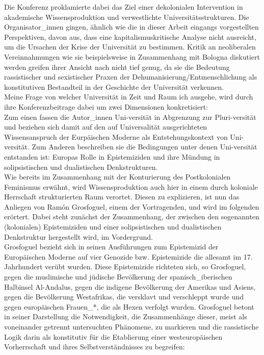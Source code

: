 Die Konferenz proklamierte dabei das Ziel einer dekolonialen
Intervention in akademische Wissensproduktion und verwestlichte
Universitätsstrukturen. Die Organisator\_innen gingen, ähnlich wie die in dieser
Arbeit eingangs vorgestellten Perspektiven, davon aus, dass eine
kapitalismuskritische Analyse nicht ausreicht, um die Ursachen der Krise der
Universität zu bestimmen. Kritik an neoliberalen Vereinnahmungen wie sie
beispielsweise in Zusammenhang mit Bologna diskutiert werden \footnotemark
{} greifen ihrer
Ansicht nach nicht tief genug, da sie die Bedeutung rassistischer und
sexistischer Praxen der Dehumanisierung/Entmenschlichung als konstitutiven
Bestandteil in der Geschichte der Universität verkennen. 
\\

Meine Frage von
welcher Universität in Zeit und Raum ich ausgehe, wird durch ihre
Konferenzbeitrage dabei um zwei Dimensionen konkretisiert:\\
 Zum einen fassen die
Autor\_innen Uni-versität in Abgrenzung zur Pluri-versität und beziehen sich
damit auf den auf Universalität ausgerichteten Wissensanspruch der Eurpäischen
Moderne als Entstehungskontext von Uni-versität. Zum Anderen beschreiben sie
die Bedingungen unter denen Uni-versität entstanden ist: Europas Rolle in
Epistemiziden und ihre Mündung in solipsistischen und dualistischen
Denkstrukturen. \\
Wie bereits im Zusammenhang mit der Konturierung des
Postkolonialen Feminismus erwähnt, wird Wissensproduktion auch hier in einem
durch koloniale Herrschaft strukturierten Raum verortet. Diesen zu explizieren,
ist nun das Anliegen von Ramón Grosfoguel, einem der Vortragenden, und wird im
folgenden erörtert. \footnotemark {} Dabei steht zunächst der Zusammenhang, der zwischen
den sogenannten (kolonialen) Epistemiziden und einer solipsistischen und
dualistischen Denkstruktur hergestellt wird, im Vordergrund. 
\\ 

Grosfoguel bezieht sich in seinen Ausführungen zum Epistemizid der Europäischen
Moderne auf vier Genozide bzw. Epistemizide die allesamt im 17. Jahrhundert
verübt wurden. Diese Epistemizide richteten sich, so Grosfoguel, gegen die
muslimische und jüdische Bevölkerung der spanisch\_iberischen Halbinsel
Al-Andalus, gegen die indigene Bevölkerung der Amerikas und Asiens, gegen die
Bevölkerung Westafrikas, die versklavt und verschleppt wurde und gegen
europäischen Frauen\_*, die als Hexen verfolgt wurden. Grosfoguel betont in
seiner Darstellung die Notwendigkeit, die Zusammenhänge dieser, meist als
voneinander getrennt untersuchten Phänomene, zu markieren und die rassistische
Logik darin als konstitutiv für die Etablierung einer westeuropäischen
Vorherrschaft und ihres Selbstverständnisses zu begreifen: 

